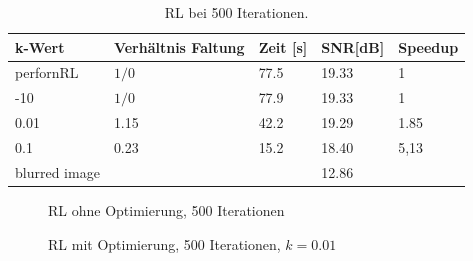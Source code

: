\documentclass[a4paper,12pt]{article}
\begin{document}
\begin{table}[h]
\begin{center}
\begin{tabular}{ | l | l | l | l | l |}
\hline
k-Wert 				& Verhältnis Faltung	& Zeit [s] 	& SNR[dB] & Speedup \\ \hline
perfornRL		 	&		$1/0$				& 	77.5 	& 19.33   & 	1	\\ \hline
-10				 	&		$1/0$				& 	77.9 	& 19.33   & 	1	\\ \hline
0.01				&		1.15				&	42.2 	& 19.29   &  	1.85\\
0.1					&		0.23				&	15.2 	& 18.40   & 	5,13\\ \hline

blurred image		&		  					& 			&	12.86 & 		\\
\hline
\end{tabular}
\caption{RL bei 500 Iterationen.}
\label{tab:konv_time_SNR_RL_500}
\end{center}
\end{table}
 

\begin{figure}[h]
\caption{RL ohne Optimierung, 500 Iterationen}%
\label{figure_konv_ohne}
\end{figure}

\begin{figure}[h]
\caption{RL mit Optimierung, 500 Iterationen, $k = 0.01$}%
\label{figure_konv_k0_01}
\end{figure}
\end{document}
